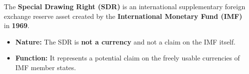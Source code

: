 \begin{formulabox}
The \textbf{Special Drawing Right (SDR)} is an international supplementary foreign exchange reserve asset created by the \textbf{International Monetary Fund (IMF)} in \textbf{1969}. 
\begin{itemize}[leftmargin=*, noitemsep]
    \item \textbf{Nature:} The SDR is \textbf{not a currency} and not a claim on the IMF itself.
    \item \textbf{Function:} It represents a potential claim on the freely usable currencies of IMF member states.
\end{itemize}
\end{formulabox}

